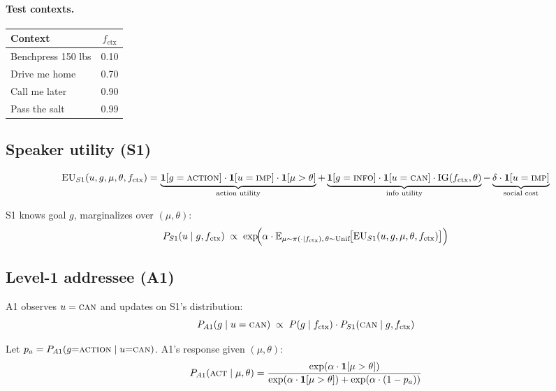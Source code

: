 \documentclass[11pt]{article}
\begin{document}
\paragraph{Test contexts.}

\begin{center}
\renewcommand{\arraystretch}{1.2}
\begin{tabular}{lc}
\toprule
\textbf{Context} & $f_{\text{ctx}}$ \\
\midrule
Benchpress 150 lbs & 0.10 \\
Drive me home      & 0.70 \\
Call me later      & 0.90 \\
Pass the salt      & 0.99 \\
\bottomrule
\end{tabular}
\end{center}

\subsection{Speaker utility (S1)}

\[
  \mathrm{EU}_{S1}(u, g, \mu, \theta, f_{\text{ctx}}) =
  \underbrace{\mathbf{1}[g = \textsc{action}]\cdot \mathbf{1}[u = \textsc{imp}]\cdot\mathbf{1}[\mu > \theta]}_{\text{action utility}}
  + \underbrace{\mathbf{1}[g = \textsc{info}]\cdot \mathbf{1}[u = \textsc{can}]\cdot\mathrm{IG}(f_{\text{ctx}}, \theta)}_{\text{info utility}}
  - \underbrace{\delta\cdot\mathbf{1}[u = \textsc{imp}]}_{\text{social cost}}
\]

S1 knows goal $g$, marginalizes over $(\mu, \theta)$:
\[
  P_{S1}(u \mid g, f_{\text{ctx}}) \;\propto\;
  \exp\!\Bigl(\alpha\cdot \mathbb{E}_{\mu \sim \pi(\cdot|f_{\text{ctx}}),\, \theta \sim \mathrm{Unif}}\!\bigl[\mathrm{EU}_{S1}(u, g, \mu, \theta, f_{\text{ctx}})\bigr]\Bigr)
\]

\subsection{Level-1 addressee (A1)}

A1 observes $u = \textsc{can}$ and updates on S1's distribution:
\[
  P_{A1}(g \mid u = \textsc{can}) \;\propto\; P(g \mid f_{\text{ctx}})\cdot P_{S1}(\textsc{can} \mid g, f_{\text{ctx}})
\]

Let $p_a = P_{A1}(g{=}\textsc{action} \mid u{=}\textsc{can})$. A1's response given $(\mu, \theta)$:
\[
  P_{A1}(\textsc{act} \mid \mu, \theta) =
  \frac{\exp(\alpha\cdot\mathbf{1}[\mu > \theta])}
       {\exp(\alpha\cdot\mathbf{1}[\mu > \theta]) + \exp(\alpha\cdot(1 - p_a))}
\]
\end{document}
